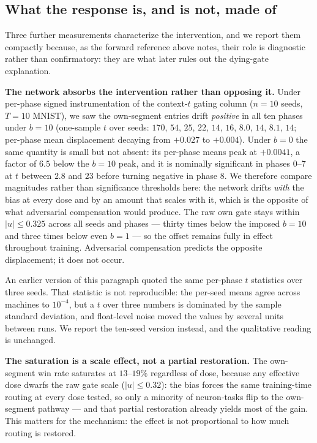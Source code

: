 \documentclass[review,12pt,number]{elsarticle}
\begin{document}
\subsection{What the response is, and is not, made of}
\label{sec:compact}
\label{sec:compensation}
\label{sec:taskrel}
\label{sec:sigdrift}

Three further measurements characterize the intervention, and we report
them compactly because, as the forward reference above notes, their
role is diagnostic rather than confirmatory: they are what later rules
out the dying-gate explanation.

\textbf{The network absorbs the intervention rather than opposing it.}
Under per-phase signed instrumentation of the context-$t$ gating column
($n=10$ seeds, $T{=}10$ MNIST), we saw the own-segment entries drift
\emph{positive} in all ten phases under $b{=}10$ (one-sample $t$ over
seeds: $170$, $54$, $25$, $22$, $14$, $16$, $8.0$, $14$, $8.1$, $14$;
per-phase mean displacement decaying from $+0.027$ to $+0.004$). Under
$b{=}0$ the same quantity is small but not absent: its per-phase means
peak at $+0.0041$, a factor of $6.5$ below the $b{=}10$ peak, and it is
nominally significant in phases $0$--$7$ at $t$ between $2.8$ and $23$
before turning negative in phase $8$. We therefore compare magnitudes
rather than significance thresholds here: the network drifts \emph{with}
the bias at every dose and by an amount that scales with it, which is
the opposite of what adversarial compensation would produce.
The raw own gate stays within $|u| \le 0.325$ across all seeds and phases
--- thirty times below the imposed $b{=}10$ and three times below even
$b{=}1$ --- so the offset remains fully in effect throughout training.
Adversarial compensation predicts the opposite displacement; it does not
occur.

An earlier version of this paragraph quoted the same per-phase
$t$ statistics over three seeds. That statistic is not reproducible: the
per-seed means agree across machines to $10^{-4}$, but a $t$ over three
numbers is dominated by the sample standard deviation, and float-level
noise moved the values by several units between runs. We report the
ten-seed version instead, and the qualitative reading is unchanged.

\textbf{The saturation is a scale effect, not a partial restoration.} The
own-segment win rate saturates at $13$--$19\%$ regardless of dose,
because any effective dose dwarfs the raw gate scale ($|u|\le 0.32$): the
bias forces the same training-time routing at every dose tested, so only
a minority of neuron-tasks flip to the own-segment pathway --- and that
partial restoration already yields most of the gain. This matters for
the mechanism: the effect is not proportional to how much routing is
restored.
\end{document}
